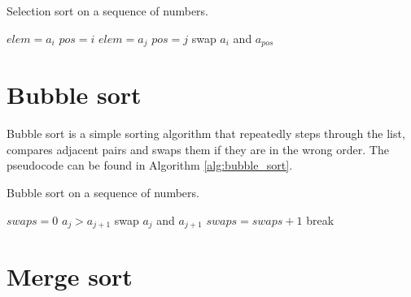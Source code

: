 \begin{algorithm}
    \caption{Selection sort on a sequence of numbers.}
    \label{alg:selection_sort}
    \begin{algorithmic}[1]
                \State $elem=a_i$
                \State $pos=i$
                        \State $elem=a_j$
                        \State $pos=j$
                    \EndIf
                \EndFor
            \EndFor
            \State swap $a_i$ and $a_{pos}$
        \EndProcedure
    \end{algorithmic}
\end{algorithm}

\section{Bubble sort}

\begin{definition} 
    Bubble sort is a simple sorting algorithm that repeatedly steps through the list, compares adjacent pairs and swaps them if they are in the wrong order. The pseudocode can be found in Algorithm \ref{alg:bubble_sort}.
\end{definition}

\begin{algorithm}
    \caption{Bubble sort on a sequence of numbers.}
    \label{alg:bubble_sort}
    \begin{algorithmic}[1]
                \State $swaps=0$
                    \If $a_j>a_{j+1}$
                        \State swap $a_j$ and $a_{j+1}$
                        \State $swaps=swaps+1$
                    \EndIf
                \EndFor
                    \State break
                \EndIf
            \EndFor
        \EndProcedure
    \end{algorithmic}
\end{algorithm}

\section{Merge sort}

